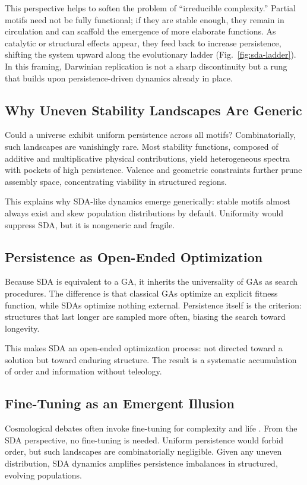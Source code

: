 \documentclass[life,article,submit,pdftex,moreauthors]{Definitions/mdpi}
\begin{document}
This perspective helps to soften the problem of “irreducible complexity.”  
Partial motifs need not be fully functional; if they are stable enough, they remain in circulation and 
can scaffold the emergence of more elaborate functions.  
As catalytic or structural effects appear, they feed back to increase persistence, shifting the system 
upward along the evolutionary ladder (Fig.~\ref{fig:sda-ladder}).  
In this framing, Darwinian replication is not a sharp discontinuity but a rung that builds upon 
persistence-driven dynamics already in place.


\subsection{Why Uneven Stability Landscapes Are Generic}
Could a universe exhibit uniform persistence across all motifs? Combinatorially, such landscapes are vanishingly rare. 
Most stability functions, composed of additive and multiplicative physical contributions, yield heterogeneous spectra with pockets of high persistence. 
Valence and geometric constraints further prune assembly space, concentrating viability in structured regions.  

This explains why SDA-like dynamics emerge generically: stable motifs almost always exist and skew population distributions by default. 
Uniformity would suppress SDA, but it is nongeneric and fragile.  

\subsection{Persistence as Open-Ended Optimization}
Because SDA is equivalent to a GA, it inherits the universality of GAs as search procedures. 
The difference is that classical GAs optimize an explicit fitness function, while SDAs optimize nothing external. 
Persistence itself is the criterion: structures that last longer are sampled more often, biasing the search toward longevity.  

This makes SDA an open-ended optimization process: not directed toward a solution but toward enduring structure. 
The result is a systematic accumulation of order and information without teleology.  

\subsection{Fine-Tuning as an Emergent Illusion}
Cosmological debates often invoke fine-tuning for complexity and life \cite{rees2000six, davies2006goldilocks}. 
From the SDA perspective, no fine-tuning is needed. 
Uniform persistence would forbid order, but such landscapes are combinatorially negligible. 
Given any uneven distribution, SDA dynamics amplifies persistence imbalances in structured, evolving populations.  
\end{document}
